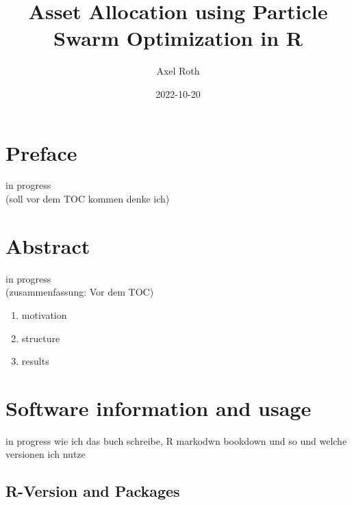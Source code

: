 \documentclass[
  oneside]{book}
\title{Asset Allocation using Particle Swarm Optimization in R}
\author{Axel Roth}
\date{2022-10-20}
\begin{document}
\maketitle

{
\setcounter{tocdepth}{1}
\tableofcontents
}
\hypertarget{preface}{%
\chapter*{Preface}\label{preface}}

\renewcommand{\chaptermark}[1]{\markboth{\uppercase{#1}}{\uppercase{#1}}}

\textbar\textbar\textbar in progress\textbar\textbar\textbar{}\\
(soll vor dem TOC kommen denke ich)

\renewcommand{\chaptermark}[1]{\markboth{\uppercase{\thechapter. \ #1}}{}}

\hypertarget{abstract}{%
\chapter*{Abstract}\label{abstract}}

\textbar\textbar\textbar in progress\textbar\textbar\textbar{}\\
(zusammenfassung: Vor dem TOC)

\begin{enumerate}
\def\labelenumi{\arabic{enumi}.}
\item
  motivation
\item
  structure
\item
  results
\end{enumerate}

\hypertarget{software-information-and-usage}{%
\chapter{Software information and usage}\label{software-information-and-usage}}

\textbar\textbar\textbar in progress\textbar\textbar\textbar{}
wie ich das buch schreibe, R markodwn bookdown und so und welche versionen ich nutze

\hypertarget{r-version-and-packages}{%
\section{R-Version and Packages}\label{r-version-and-packages}}
\end{document}
